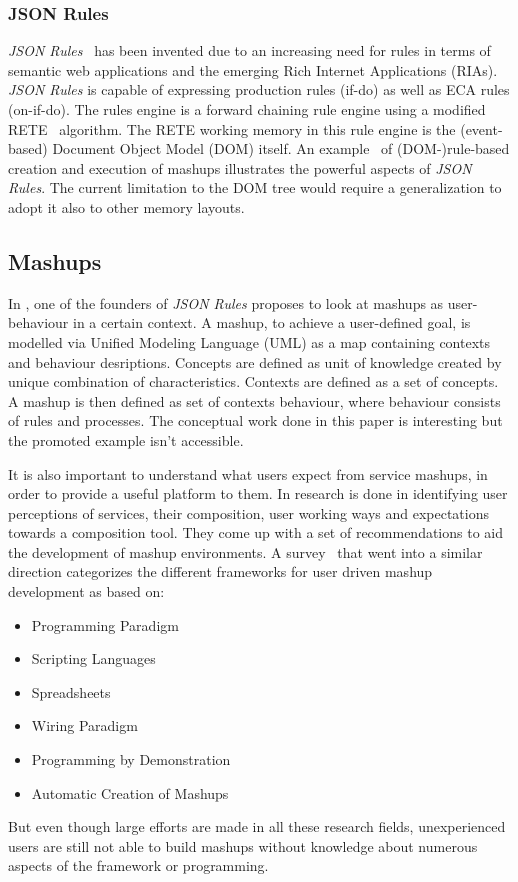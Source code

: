 \documentclass[11pt]{article}%
\begin{document}
\subsubsection{JSON Rules}
\emph{JSON Rules}~\cite{2008-Giurca_Pascalau-JSON_Rules.pdf} has been invented due to an increasing need for rules in terms of semantic web applications and the emerging Rich Internet Applications (RIAs). \emph{JSON Rules} is capable of expressing production rules (if-do) as well as ECA rules (on-if-do). The rules engine is a forward chaining rule engine using a modified RETE~\cite{1982-Crockford-RETE.pdf} algorithm. The RETE working memory in this rule engine is the (event-based) Document Object Model (DOM) itself. An example~\cite{2009-Pascalau_Giurca-RBACEM.pdf} of (DOM-)rule-based creation and execution of mashups illustrates the powerful aspects of \emph{JSON Rules}. The current limitation to the DOM tree would require a generalization to adopt it also to other memory layouts.

\subsection{Mashups}
In \cite{2011-Pascalau-MBC.pdf}, one of the founders of \emph{JSON Rules} proposes to look at mashups as user-behaviour in a certain context. A mashup, to achieve a user-defined goal, is modelled via Unified Modeling Language (UML) as a map containing contexts and behaviour desriptions. Concepts are defined as unit of knowledge created by unique combination of characteristics. Contexts are defined as a set of concepts. A mashup is then defined as  set of contexts behaviour, where behaviour consists of rules and processes. The conceptual work done in this paper is interesting but the promoted example isn't accessible.

It is also important to understand what users expect from service mashups, in order to provide a useful platform to them. In \cite{2010-Namoun_etal-EURCW.pdf} research is done in identifying user perceptions of services, their composition, user working ways and expectations towards a composition tool. They come up with a set of recommendations to aid the development of mashup environments. A survey~\cite{2009-Fischer_etal-OCAMG.pdf} that went into a similar direction categorizes the different frameworks for user driven mashup development as based on:
 \begin{itemize}
  \item Programming Paradigm
  \item Scripting Languages
  \item Spreadsheets
  \item Wiring Paradigm
  \item Programming by Demonstration
  \item Automatic Creation of Mashups
\end{itemize}
But even though large efforts are made in all these research fields, unexperienced users are still not able to build mashups without knowledge about numerous aspects of the framework or programming.
\end{document}
